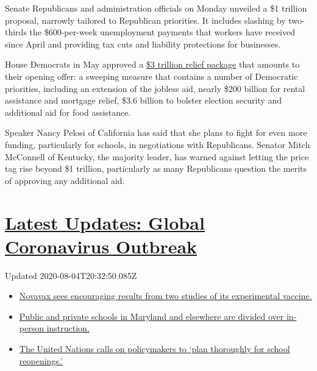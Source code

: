 Senate Republicans and administration officials on Monday unveiled a \$1
trillion proposal, narrowly tailored to Republican priorities. It
includes slashing by two-thirds the \$600-per-week unemployment payments
that workers have received since April and providing tax cuts and
liability protections for businesses.

House Democrats in May approved a
\href{https://www.congress.gov/116/bills/hr6800/BILLS-116hr6800ih.pdf}{\$3
trillion relief package} that amounts to their opening offer: a sweeping
measure that contains a number of Democratic priorities, including an
extension of the jobless aid, nearly \$200 billion for rental assistance
and mortgage relief, \$3.6 billion to bolster election security and
additional aid for food assistance.

Speaker Nancy Pelosi of California has said that she plans to fight for
even more funding, particularly for schools, in negotiations with
Republicans. Senator Mitch McConnell of Kentucky, the majority leader,
has warned against letting the price tag rise beyond \$1 trillion,
particularly as many Republicans question the merits of approving any
additional aid.

\hypertarget{latest-updates-global-coronavirus-outbreak}{%
\section{\texorpdfstring{\href{https://www.nytimes.com/2020/08/04/world/coronavirus-cases.html?action=click\&pgtype=Article\&state=default\&region=MAIN_CONTENT_1\&context=storylines_live_updates}{Latest
Updates: Global Coronavirus
Outbreak}}{Latest Updates: Global Coronavirus Outbreak}}\label{latest-updates-global-coronavirus-outbreak}}

Updated 2020-08-04T20:32:50.085Z

\begin{itemize}
\tightlist
\item
  \href{https://www.nytimes.com/2020/08/04/world/coronavirus-cases.html?action=click\&pgtype=Article\&state=default\&region=MAIN_CONTENT_1\&context=storylines_live_updates\#link-1228a480}{Novavax
  sees encouraging results from two studies of its experimental
  vaccine.}
\item
  \href{https://www.nytimes.com/2020/08/04/world/coronavirus-cases.html?action=click\&pgtype=Article\&state=default\&region=MAIN_CONTENT_1\&context=storylines_live_updates\#link-4825b93}{Public
  and private schools in Maryland and elsewhere are divided over
  in-person instruction.}
\item
  \href{https://www.nytimes.com/2020/08/04/world/coronavirus-cases.html?action=click\&pgtype=Article\&state=default\&region=MAIN_CONTENT_1\&context=storylines_live_updates\#link-50f7386d}{The
  United Nations calls on policymakers to `plan thoroughly for school
  reopenings.'}
\end{itemize}


